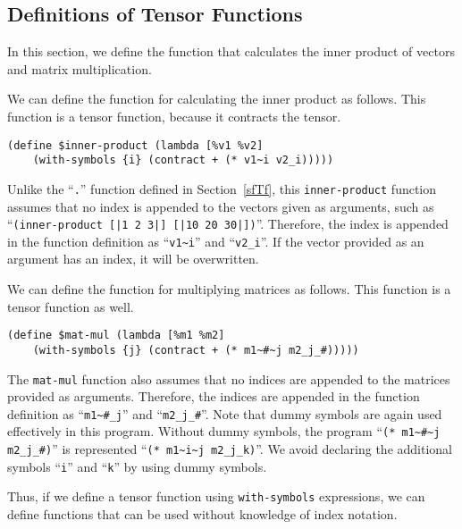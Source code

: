 \documentclass[acmlarge]{acmart}
\begin{document}
\subsection{Definitions of Tensor Functions}\label{egisonPara}

In this section, we define the function that calculates the inner product of vectors and matrix multiplication.

We can define the function for calculating the inner product as follows.
This function is a tensor function, because it contracts the tensor.

{\footnotesize
\begin{verbatim}
(define $inner-product (lambda [%v1 %v2]
    (with-symbols {i} (contract + (* v1~i v2_i)))))
\end{verbatim}
}

Unlike the ``\texttt{.}'' function defined in Section~\ref{sfTf}, this \texttt{inner-product} function assumes that no index is appended to the vectors given as arguments, such as ``\texttt{(inner-product [|1 2 3|] [|10 20 30|])}''.
Therefore, the index is appended in the function definition as ``\verb|v1~i|'' and ``\verb|v2_i|''.
If the vector provided as an argument has an index, it will be overwritten.

We can define the function for multiplying matrices as follows.
This function is a tensor function as well.

{\footnotesize
\begin{verbatim}
(define $mat-mul (lambda [%m1 %m2]
    (with-symbols {j} (contract + (* m1~#~j m2_j_#)))))
\end{verbatim}
}

The \texttt{mat-mul} function also assumes that no indices are appended to the matrices provided as arguments.
Therefore, the indices are appended in the function definition as ``\verb|m1~#_j|'' and ``\verb|m2_j_#|''.
Note that dummy symbols are again used effectively in this program.
Without dummy symbols, the program ``\verb|(* m1~#~j m2_j_#)|'' is represented ``\verb|(* m1~i~j m2_j_k)|''.
We avoid declaring the additional symbols ``\texttt{i}'' and ``\texttt{k}'' by using dummy symbols.

Thus, if we define a tensor function using \texttt{with-symbols} expressions, we can define functions that can be used without knowledge of index notation.
\end{document}
